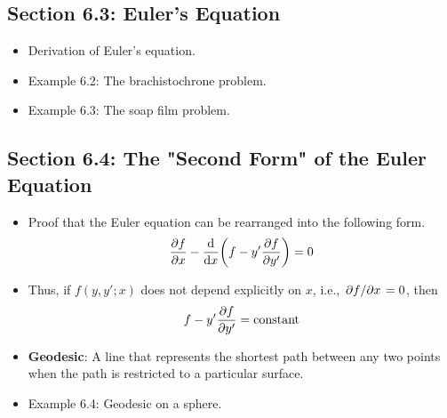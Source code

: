 \documentclass[../notes.tex]{subfiles}
\begin{document}
\subsection*{Section 6.3: Euler's Equation}
\begin{itemize}
    \item Derivation of Euler's equation.
    \item Example 6.2: The brachistochrone problem.
    \item Example 6.3: The soap film problem.
\end{itemize}


\subsection*{Section 6.4: The "Second Form" of the Euler Equation}
\begin{itemize}
    \item Proof that the Euler equation can be rearranged into the following form.
    \begin{equation*}
        \pdv{f}{x}-\dv{x}(f-y'\pdv{f}{y'}) = 0
    \end{equation*}
    \item Thus, if $f(y,y';x)$ does not depend explicitly on $x$, i.e., $\pdv*{f}{x}=0$, then
    \begin{equation*}
        f-y'\pdv{f}{y'} = \text{constant}
    \end{equation*}
    \item \textbf{Geodesic}: A line that represents the shortest path between any two points when the path is restricted to a particular surface.
    \item Example 6.4: Geodesic on a sphere.
\end{itemize}
\end{document}

